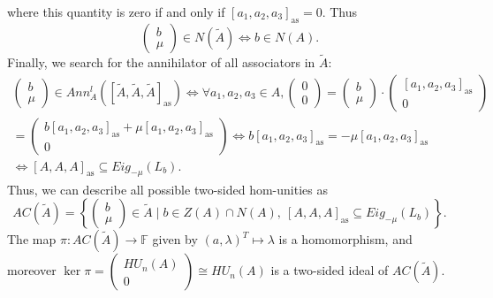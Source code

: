 \documentclass[12pt]{article}
\begin{document}
		where this quantity is zero if and only if $[a_1,a_2,a_3]_{\mathrm{as}}=0$. Thus
		\begin{equation*}
			\begin{pmatrix}
				b \\ \mu
			\end{pmatrix}\in N(\tilde{A}) \Leftrightarrow b\in N(A).
		\end{equation*}
		Finally, we search for the annihilator of all associators in $\tilde{A}$:
		\begin{multline*}
			\begin{pmatrix}
				b \\ \mu
			\end{pmatrix}\in Ann_A^l([\tilde{A},\tilde{A},\tilde{A}]_{\mathrm{as}})\Leftrightarrow \forall a_1,a_2,a_3\in A, \begin{pmatrix}
				0 \\ 0
			\end{pmatrix}=\begin{pmatrix}
				b \\ \mu
			\end{pmatrix}\cdot \begin{pmatrix}
				[a_1,a_2,a_3]_{\mathrm{as}} \\ 0
			\end{pmatrix}\\
			=\begin{pmatrix}
				b[a_1,a_2,a_3]_{\mathrm{as}}+\mu[a_1,a_2,a_3]_{\mathrm{as}} \\ 0
			\end{pmatrix}\Leftrightarrow b[a_1,a_2,a_3]_{\mathrm{as}}=-\mu[a_1,a_2,a_3]_{\mathrm{as}}\\
			\Leftrightarrow [A,A,A]_{\mathrm{as}}\subseteq Eig_{-\mu}(L_b).
		\end{multline*}
		Thus, we can describe all possible two-sided hom-unities as
		\begin{equation*}
			AC(\tilde{A})=\left\{\begin{pmatrix}
				b \\ \mu
			\end{pmatrix}\in\tilde{A}\mid b\in Z(A)\cap N(A),\ [A,A,A]_{\mathrm{as}}\subseteq Eig_{-\mu}(L_b)\right\}.
		\end{equation*}
		The map $\pi\colon AC(\tilde{A}) \rightarrow \mathbb{F}$ given by $(a,\lambda)^T \mapsto \lambda$ is a homomorphism, and moreover $\ker\pi=\begin{pmatrix}
			HU_n(A) \\ 0
		\end{pmatrix}\cong HU_n(A)$ is a two-sided ideal of $AC(\tilde{A})$.
\end{document}
